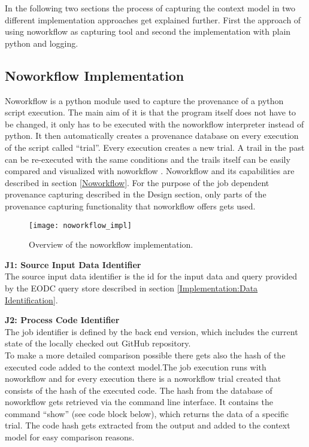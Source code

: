 \documentclass[draft,final]{vutinfth} %
\begin{document}
In the following two sections the process of capturing the context model in two different implementation approaches get explained further. First the approach of using noworkflow as capturing tool and second the implementation with plain python and logging. 

\subsection{Noworkflow Implementation}\label{Implementation:Noworkflow Implementation}
Noworkflow is a python module used to capture the provenance of a python script execution. The main aim of it is that the program itself does not have to be changed, it only has to be executed with the noworkflow interpreter instead of python. It then automatically creates a provenance database on every execution of the script called “trial”. Every execution creates a new trial. A trail in the past can be re-executed with the same conditions and the trails itself can be easily compared and visualized with noworkflow \cite{c9e0604becba42af96a9cb0a6f60018b}. Noworkflow and its capabilities are described in section \ref{Noworkflow}. 
For the purpose of the job dependent provenance capturing described in the Design section, only parts of the provenance capturing functionality that noworkflow offers gets used.    

\begin{figure}[h]
	\centering
	\texttt{[image: noworkflow\_impl]}
	\caption{Overview of the noworkflow implementation.}
	\label{fig:noworkflow_impl} %
\end{figure}

\textbf{J1:  Source Input Data Identifier} \\
The source input data identifier is the id for the input data and query provided by the EODC query store described in section \ref{Implementation:Data Identification}. 


\textbf{J2: Process Code Identifier} \\
The job identifier is defined by the back end version, which includes the current state of the locally checked out GitHub repository.\\
To make a more detailed comparison possible there gets also the hash of the executed code added to the context model.The job execution runs with noworkflow and for every execution there is a noworkflow trial created that consists of the hash of the executed code. The hash from the database of noworkflow gets retrieved via the command line interface. It contains the command “show” (see code block below), which returns the data of a specific trial. The code hash gets extracted from the output and added to the context model for easy comparison reasons. 
\end{document}
